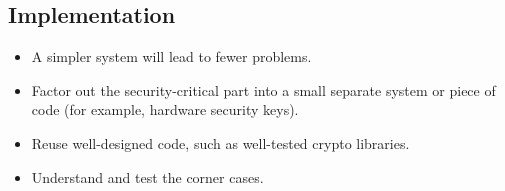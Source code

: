 \subsection{Implementation}
\begin{itemize}
	\item A simpler system will lead to fewer problems.
	\item Factor out the security-critical part into a small separate system or piece of code (for example, hardware security keys).
	\item Reuse well-designed code, such as well-tested crypto libraries.
	\item Understand and test the corner cases.
\end{itemize}



